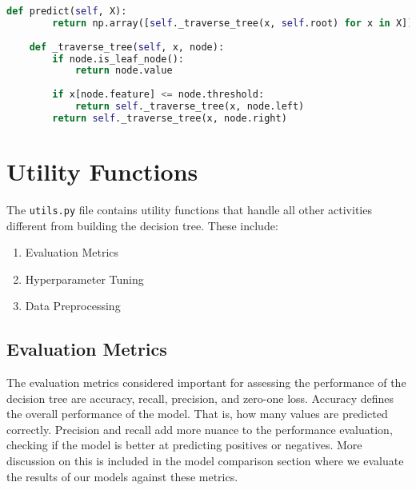 \documentclass{article}
\begin{document}
\begin{lstlisting}[language=Python, caption=Predict method]
    def predict(self, X):
        return np.array([self._traverse_tree(x, self.root) for x in X])
    
    def _traverse_tree(self, x, node):
        if node.is_leaf_node():
            return node.value
    
        if x[node.feature] <= node.threshold:
            return self._traverse_tree(x, node.left)
        return self._traverse_tree(x, node.right)
\end{lstlisting}

\section{Utility Functions}
The \texttt{utils.py} file contains utility functions that handle all other activities different from building the decision tree. These include:
\begin{enumerate}
    \item Evaluation Metrics
    \item Hyperparameter Tuning
    \item Data Preprocessing
\end{enumerate}

\subsection{Evaluation Metrics}
The evaluation metrics considered important for assessing the performance of the decision tree are accuracy, recall, precision, and zero-one loss. Accuracy defines the overall performance of the model. That is, how many values are predicted correctly. Precision and recall add more nuance to the performance evaluation, checking if the model is better at predicting positives or negatives. More discussion on this is included in the model comparison section where we evaluate the results of our models against these metrics.
\end{document}
